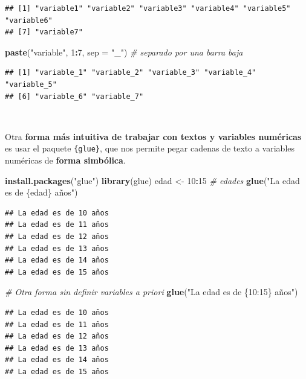 \documentclass[11pt,]{book}
\newenvironment{Shaded}{\begin{snugshade}}{\end{snugshade}}
\newcommand{\CommentTok}[1]{\textcolor[rgb]{0.37,0.37,0.37}{\textit{#1}}}
\newcommand{\DataTypeTok}[1]{\textcolor[rgb]{0.27,0.27,0.27}{#1}}
\newcommand{\DecValTok}[1]{\textcolor[rgb]{0.06,0.06,0.06}{#1}}
\newcommand{\KeywordTok}[1]{\textcolor[rgb]{0.27,0.27,0.27}{\textbf{#1}}}
\newcommand{\NormalTok}[1]{#1}
\newcommand{\OperatorTok}[1]{\textcolor[rgb]{0.43,0.43,0.43}{\textbf{#1}}}
\newcommand{\StringTok}[1]{\textcolor[rgb]{0.5,0.5,0.5}{#1}}
\begin{document}
\begin{verbatim}
## [1] "variable1" "variable2" "variable3" "variable4" "variable5" "variable6"
## [7] "variable7"
\end{verbatim}

\begin{Shaded}
\begin{Highlighting}[]
\KeywordTok{paste}\NormalTok{(}\StringTok{"variable"}\NormalTok{, }\DecValTok{1}\OperatorTok{:}\DecValTok{7}\NormalTok{, }\DataTypeTok{sep =} \StringTok{"_"}\NormalTok{) }\CommentTok{# separado por una barra baja}
\end{Highlighting}
\end{Shaded}

\begin{verbatim}
## [1] "variable_1" "variable_2" "variable_3" "variable_4" "variable_5"
## [6] "variable_6" "variable_7"
\end{verbatim}

~

Otra \textbf{forma más intuitiva de trabajar con textos y variables numéricas} es usar el paquete \texttt{\{glue\}}, que nos permite pegar cadenas de texto a variables numéricas de \textbf{forma simbólica}.

\begin{Shaded}
\begin{Highlighting}[]
\KeywordTok{install.packages}\NormalTok{(}\StringTok{"glue"}\NormalTok{)}
\KeywordTok{library}\NormalTok{(glue)}
\NormalTok{edad <-}\StringTok{ }\DecValTok{10}\OperatorTok{:}\DecValTok{15} \CommentTok{# edades}
\KeywordTok{glue}\NormalTok{(}\StringTok{"La edad es de \{edad\} años"}\NormalTok{)}
\end{Highlighting}
\end{Shaded}

\begin{verbatim}
## La edad es de 10 años
## La edad es de 11 años
## La edad es de 12 años
## La edad es de 13 años
## La edad es de 14 años
## La edad es de 15 años
\end{verbatim}

\begin{Shaded}
\begin{Highlighting}[]
\CommentTok{# Otra forma sin definir variables a priori}
\KeywordTok{glue}\NormalTok{(}\StringTok{"La edad es de \{10:15\} años"}\NormalTok{)}
\end{Highlighting}
\end{Shaded}

\begin{verbatim}
## La edad es de 10 años
## La edad es de 11 años
## La edad es de 12 años
## La edad es de 13 años
## La edad es de 14 años
## La edad es de 15 años
\end{verbatim}
\end{document}
